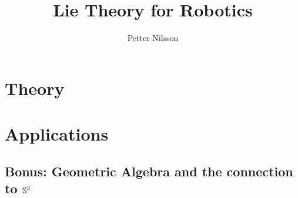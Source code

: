 \documentclass{scrbook}
\title{Lie Theory for Robotics}
\author{Petter Nilsson}
\begin{document}
\frontmatter

\maketitle

\tableofcontents

\mainmatter



\part{Theory}













\part{Applications}



















\chapter{Bonus: Geometric Algebra and the connection to \texorpdfstring{${\mathbb{S}^3}$}{S3}}

\backmatter

\printbibliography



\end{document}
